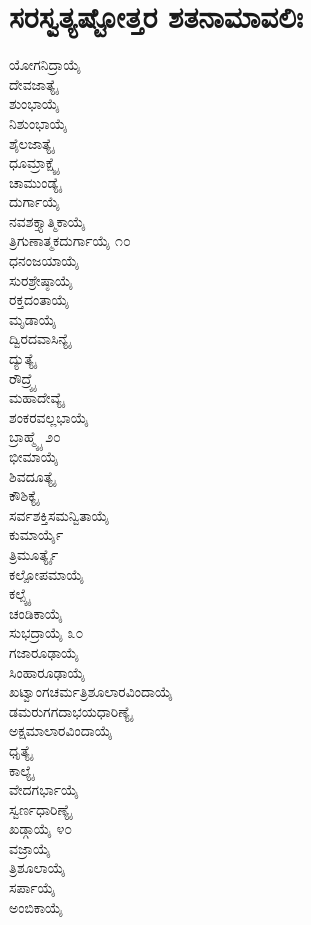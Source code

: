 \section{ಸರಸ್ವತ್ಯಷ್ಟೋತ್ತರ ಶತನಾಮಾವಲಿಃ}
\begin{multicols}{2}
ಯೋಗನಿದ್ರಾಯೈ\\
ದೇವಜಾತ್ಯೈ\\
ಶುಂಭಾಯೈ\\
ನಿಶುಂಭಾಯೈ\\
ಶೈಲಜಾತ್ಯೈ\\
ಧೂಮ್ರಾಕ್ಷ್ಯೈ\\
ಚಾಮುಂಡ್ಯೈ\\
ದುರ್ಗಾಯೈ\\
ನವಶಕ್ತ್ಯಾತ್ಮಿಕಾಯೈ\\
ತ್ರಿಗುಣಾತ್ಮಕದುರ್ಗಾಯೈ ೧೦\\
ಧನಂಜಯಾಯೈ\\
ಸುರಶ್ರೇಷ್ಠಾಯೈ\\
ರಕ್ತದಂತಾಯೈ\\
ಮೃಡಾಯೈ\\
ದ್ವಿರದವಾಸಿನ್ಯೈ\\
ದ್ಯುತ್ಯೈ\\
ರೌದ್ರ್ಯೈ\\
ಮಹಾದೇವ್ಯೈ\\
ಶಂಕರವಲ್ಲಭಾಯೈ\\
ಬ್ರಾಹ್ಮ್ಯೈ ೨೦\\
ಭೀಮಾಯೈ\\
ಶಿವದೂತ್ಯೈ\\
ಕೌಶಿಕ್ಯೈ\\
ಸರ್ವಶಕ್ತಿಸಮನ್ವಿತಾಯೈ\\
ಕುಮಾರ್ಯೈ\\
ತ್ರಿಮೂರ್ತ್ಯೈ\\
ಕಲ್ಪೋಪಮಾಯೈ\\
ಕಲ್ಪ್ಯೈ\\
ಚಂಡಿಕಾಯೈ\\
ಸುಭದ್ರಾಯೈ ೩೦\\
ಗಜಾರೂಢಾಯೈ\\
ಸಿಂಹಾರೂಢಾಯೈ\\
ಖಟ್ವಾಂಗಚರ್ಮತ್ರಿಶೂಲಾರವಿಂದಾಯೈ\\
ಡಮರುಗಗದಾಭಯಧಾರಿಣ್ಯೈ\\
ಅಕ್ಷಮಾಲಾರವಿಂದಾಯೈ\\
ಧೃತ್ಯೈ\\
ಕಾಲ್ಯೈ\\
ವೇದಗರ್ಭಾಯೈ\\
ಸ್ವರ್ಣಧಾರಿಣ್ಯೈ\\
ಖಡ್ಗಾಯೈ ೪೦\\
ವಜ್ರಾಯೈ\\
ತ್ರಿಶೂಲಾಯೈ\\
ಸರ್ಪಾಯೈ\\
ಅಂಬಿಕಾಯೈ\\

\end{multicols}
